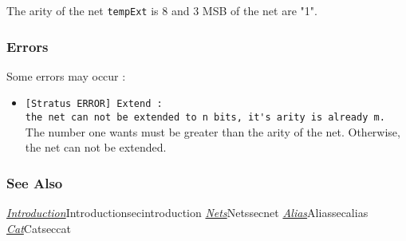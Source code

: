 \indent The arity of the net \verb-tempExt- is 8 and 3 MSB of the net are "1".
  
\subsubsection{Errors}
    
Some errors may occur :
\begin{itemize}
    \item \verb-[Stratus ERROR] Extend :-\\\verb-the net can not be extended to n bits, it's arity is already m.-\\The number one wants must be greater than the arity of the net. Otherwise, the net can not be extended.
\end{itemize}
        
\subsubsection{See Also}

\hyperref[ref]{\emph{Introduction}}{}{Introduction}{secintroduction}
\hyperref[ref]{\emph{Nets}}{}{Nets}{secnet}
\hyperref[ref]{\emph{Alias}}{}{Alias}{secalias}
\hyperref[ref]{\emph{Cat}}{}{Cat}{seccat}
